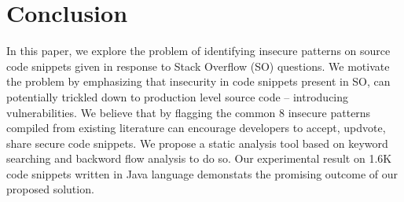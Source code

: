 \section{Conclusion}
\label{sec:conclusion}
In this paper, we explore the problem of  identifying insecure patterns on source code snippets given in response to Stack Overflow (SO) questions.  
We motivate the problem by emphasizing that insecurity in code snippets present in SO, 
can potentially trickled down to production level source code -- introducing vulnerabilities.
We believe that by flagging the common 8 insecure patterns compiled from existing literature 
can encourage developers to accept, updvote, share secure code snippets. 
We propose a static analysis tool based on keyword searching and backword flow
analysis to do so. Our experimental result on 1.6K code snippets written in Java language
demonstats the promising outcome of our proposed solution.  



